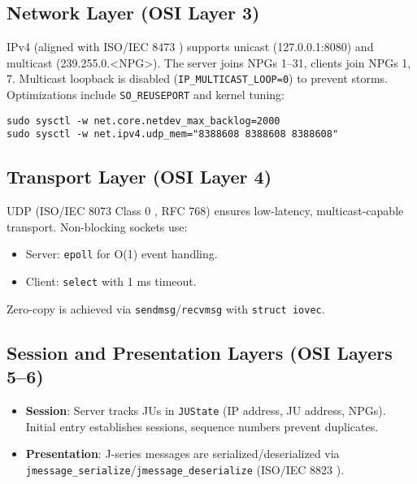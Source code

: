 \documentclass{article}
\begin{document}
\subsection{Network Layer (OSI Layer 3)}
IPv4 (aligned with ISO/IEC 8473 \cite{iso8473}) supports unicast (127.0.0.1:8080) and multicast (239.255.0.<NPG>). The server joins NPGs 1--31, clients join NPGs 1, 7. Multicast loopback is disabled (\texttt{IP\_MULTICAST\_LOOP=0}) to prevent storms. Optimizations include \texttt{SO\_REUSEPORT} and kernel tuning:
\begin{lstlisting}[caption={Kernel Tuning Commands}]
sudo sysctl -w net.core.netdev_max_backlog=2000
sudo sysctl -w net.ipv4.udp_mem="8388608 8388608 8388608"
\end{lstlisting}

\subsection{Transport Layer (OSI Layer 4)}
UDP (ISO/IEC 8073 Class 0 \cite{iso8073}, RFC 768) ensures low-latency, multicast-capable transport. Non-blocking sockets use:
\begin{itemize}
    \item Server: \texttt{epoll} for O(1) event handling.
    \item Client: \texttt{select} with 1 ms timeout.
\end{itemize}
Zero-copy is achieved via \texttt{sendmsg}/\texttt{recvmsg} with \texttt{struct iovec}.

\subsection{Session and Presentation Layers (OSI Layers 5--6)}
\begin{itemize}
    \item \textbf{Session}: Server tracks JUs in \texttt{JUState} (IP address, JU address, NPGs). Initial entry establishes sessions, sequence numbers prevent duplicates.
    \item \textbf{Presentation}: J-series messages are serialized/deserialized via \texttt{jmessage\_serialize}/\texttt{jmessage\_deserialize} (ISO/IEC 8823 \cite{iso8823}).
\end{itemize}
\end{document}
